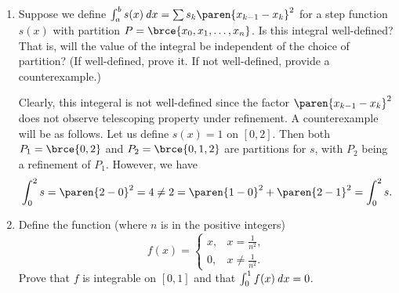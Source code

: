 \documentclass[a4paper]{article}
\begin{document}
\begin{enumerate}
  \begin{proof}
    We have
    \begin{align*}
      \int_1^b \frac{\dx}{x}
        &= \frac1a \int_a^{ab} \frac{\dx}{x/a} && \reason{by Theorem~1.19,} \\
        &= \int_a^{ab} \frac{\dx}{x} && \reason{by homogeneity and cancellation,} \\
        &= \int_a^1 \frac{\dx}{x} + \int_1^{ab} \frac{\dx}x && \reason{by Theorem~1.17,} \\
        &= -\int_1^a \frac{\dx}{x} + \int_1^{ab} \frac{\dx}x && \reason{by our convention.}
    \end{align*}
    Move the first term of the RHS to the LHS and we obtain the equation.
  \end{proof}

  We can rewrite the equation in terms of the function \(f\) as
  \[
    f(a) + f(b) = f(ab).
  \]
  The logarithm functions observe the stated property
  \[
    \log a + \log b = \log ab.
  \]

\item Suppose we define
  \(\int_a^b s(x) \dx = \sum s_k \paren{x_{k-1} - x_k}^2\) for a step
  function \(s(x)\) with partition \(P = \brce{x_0, x_1, \dotsc, x_n}\).
  Is this integral well-defined?  That is, will the value of the integral
  be independent of the choice of partition?  (If well-defined, prove it.
  If not well-defined, provide a counterexample.)

  Clearly, this integeral is not well-defined since the factor
  \(\paren{x_{k-1} - x_k}^2\) does not observe telescoping property
  under refinement.  A counterexample will be as follows.  Let us define
  \(s(x) = 1\) on \([0, 2]\).  Then both \(P_1 = \brce{0, 2}\) and
  \(P_2 = \brce{0, 1, 2}\) are partitions for \(s\), with \(P_2\) being
  a refinement of \(P_1\).  However, we have
  \begin{displaymath}
    \int_0^2 s = \paren{2-0}^2 = 4 \ne 2 = \paren{1-0}^2 + \paren{2-1}^2 = \int_0^2 s.
  \end{displaymath}

\item[\bonus] Define the function (where \(n\) is in the positive integers)
  \[
    f(x) =
    \begin{cases}
      x, & x = \frac1{n^2}, \\[1ex]
      0, & x \ne \frac1{n^2}.
    \end{cases}
  \]
  Prove that \(f\) is integrable on \([0, 1]\) and that
  \(\int_0^1 f(x) \mathop{}\!\mathit{d} x = 0\).
\end{enumerate}
\end{document}
